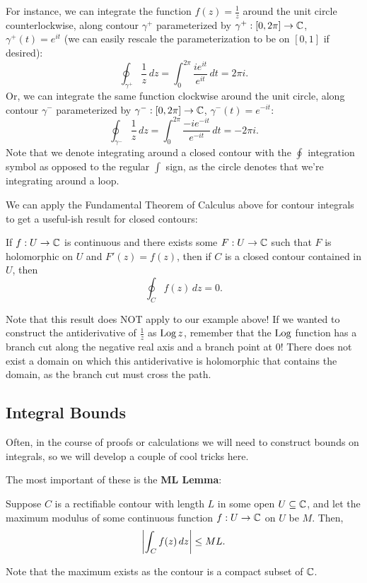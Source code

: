 For instance, we can integrate the function $f(z) = \frac 1z$ around the unit circle counterlockwise, along contour $\gamma^+$ parameterized by $\gamma^+ : [0, 2\pi] \to \mathbb C$, $\gamma^+(t) = e^{it}$ (we can easily rescale the parameterization to be on $[0,1]$ if desired):
\[ \oint_{\gamma^+} \frac 1z \, dz = \int_0^{2\pi} \frac{i e^{it}}{e^{it}} \, dt = 2\pi i.\]
Or, we can integrate the same function clockwise around the unit circle, along contour $\gamma^-$ parameterized by $\gamma^- : [0, 2\pi] \to \mathbb C$, $\gamma^-(t) = e^{-it}$:
\[ \oint_{\gamma^-} \frac 1z \, dz = \int_0^{2\pi} \frac{-i e^{-it}}{e^{-it}} \, dt = -2\pi i.\]
Note that we denote integrating around a closed contour with the $\oint$ integration symbol as opposed to the regular $\int$ sign, as the circle denotes that we're integrating around a loop.

We can apply the Fundamental Theorem of Calculus above for contour integrals to get a useful-ish result for closed contours:
\begin{corollary}
  If $f : U \to \mathbb C$ is continuous and there exists some $F : U \to \mathbb C$ such that $F$ is holomorphic on $U$ and $F'(z) = f(z)$, then if $C$ is a closed contour contained in $U$, then \[\oint_C f(z) \, dz = 0.\]
\end{corollary}
Note that this result does NOT apply to our example above! If we wanted to construct the antiderivative of $\frac 1z$ as $\operatorname*{Log} z$, remember that the $\operatorname*{Log}$ function has a branch cut along the negative real axis and a branch point at 0! There does not exist a domain on which this antiderivative is holomorphic that contains the domain, as the branch cut must cross the path.

\subsection{Integral Bounds}
Often, in the course of proofs or calculations we will need to construct bounds on integrals, so we will develop a couple of cool tricks here.

The most important of these is the \textbf{ML Lemma}:
\begin{theorem}[ML Lemma]
  Suppose $C$ is a rectifiable contour with length $L$ in some open $U \subseteq \mathbb C$, and let the maximum modulus of some continuous function $f : U \to \mathbb C$ on $U$ be $M$. Then, \[\left\lvert \int_C f(z) \, dz \right\rvert \leq ML .\]
\end{theorem}
Note that the maximum exists as the contour is a compact subset of $\mathbb C$.

